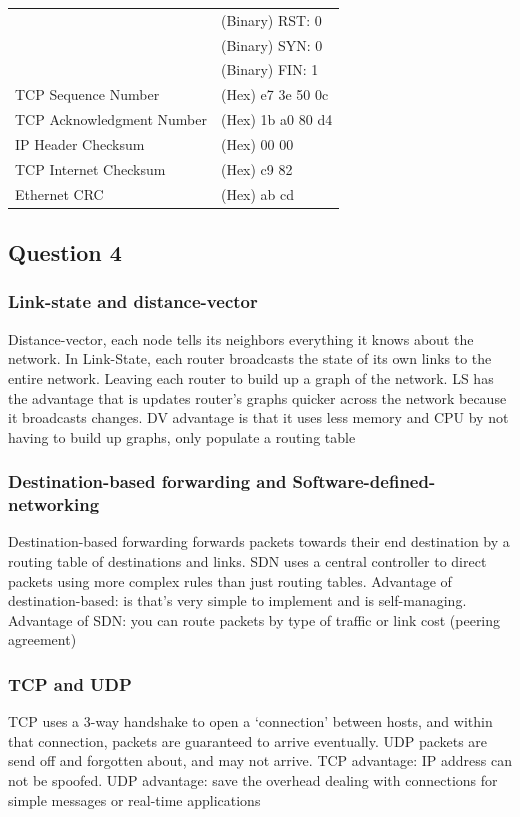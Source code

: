 \documentclass[12pt, a4paper]{article}
\begin{document}
\begin{table}[H]
\begin{tabular}{ll}
		                             & (Binary) RST: 0                                          \\
		                             & (Binary) SYN: 0                                          \\
		                             & (Binary) FIN: 1                                          \\
		TCP Sequence Number          & (Hex) e7 3e 50 0c                                        \\
		TCP Acknowledgment Number    & (Hex) 1b a0 80 d4                                        \\
		IP Header Checksum           & (Hex) 00 00                                              \\
		TCP Internet Checksum        & (Hex) c9 82                                              \\
		Ethernet CRC                 & (Hex) ab cd
	\end{tabular}
\end{table}
\subsection{Question 4}
\subsubsection{Link-state and distance-vector}
Distance-vector, each node tells its neighbors everything it knows about the network. In Link-State, each router broadcasts the state of its own links to the entire network. Leaving each router to build up a graph of the network. LS has the advantage that is updates router's graphs quicker across the network because it broadcasts changes. DV advantage is that it uses less memory and CPU by not having to build up graphs, only populate a routing table
\subsubsection{Destination-based forwarding and Software-defined-networking}
Destination-based forwarding forwards packets towards their end destination by a routing table of destinations and links. SDN uses a central controller to direct packets using more complex rules than just routing tables. Advantage of destination-based: is that's very simple to implement and is self-managing. Advantage of SDN: you can route packets by type of traffic or link cost (peering agreement)
\subsubsection{TCP and UDP}
TCP uses a 3-way handshake to open a `connection' between hosts, and within that connection, packets are guaranteed to arrive eventually. UDP packets are send off and forgotten about, and may not arrive. TCP advantage: IP address can not be spoofed. UDP advantage: save the overhead dealing with connections for simple messages or real-time applications
\end{document}
